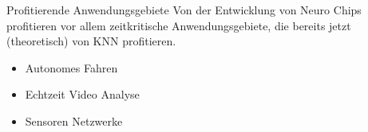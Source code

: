 \begin{slide}{Profitierende Anwendungsgebiete}
	Von der Entwicklung von Neuro Chips profitieren vor allem zeitkritische Anwendungsgebiete, die bereits jetzt (theoretisch) von KNN profitieren.
	
	\begin{itemize}
		\item Autonomes Fahren
		\item Echtzeit Video Analyse
		\item Sensoren Netzwerke
	\end{itemize}
\end{slide}